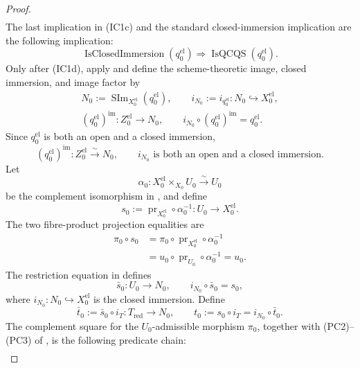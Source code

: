 \begin{proof}
\[\begin{aligned}
  \end{aligned}                                                   \tag{IC1c}
  \]
  The last implication in (IC1c) and the standard closed-immersion implication
  are the following implication:
  \[
    \operatorname{IsClosedImmersion}(q_0^{\mathrm{el}})
      \Longrightarrow\operatorname{IsQCQS}(q_0^{\mathrm{el}}).     \tag{IC1d}
  \]
  Only after (IC1d), apply
  and define the scheme-theoretic image, closed immersion, and image factor by
  \[
  \begin{gathered}
    N_0:=\operatorname{SIm}_{X_0^{\mathrm{el}}}(q_0^{\mathrm{el}}),\qquad
    i_{N_0}:=i_{q_0^{\mathrm{el}}}\colon
      N_0\hookrightarrow X_0^{\mathrm{el}},\\
    (q_0^{\mathrm{el}})^{\mathrm{im}}\colon
      Z_0^{\mathrm{el}}\longrightarrow N_0,\qquad
    i_{N_0}\circ(q_0^{\mathrm{el}})^{\mathrm{im}}=q_0^{\mathrm{el}}.
  \end{gathered}
  \]
  Since \(q_0^{\mathrm{el}}\) is both an open and a closed immersion,
  \[
    (q_0^{\mathrm{el}})^{\mathrm{im}}\colon
      Z_0^{\mathrm{el}}\xrightarrow{\sim}N_0,\qquad
    i_{N_0}\text{ is both an open and a closed immersion}.        \tag{IC2}
  \]
  Let
  \[
    \alpha_0\colon X_0^{\mathrm{el}}\times_{X_0}U_0
      \xrightarrow{\sim}U_0
  \]
  be the complement isomorphism in
  , and define
  \[
    s_0:=\operatorname{pr}_{X_0^{\mathrm{el}}}\circ\alpha_0^{-1}
      \colon U_0\to X_0^{\mathrm{el}}.
  \]
  The two fibre-product projection equalities are
  \[
  \begin{aligned}
    \pi_0\circ s_0
      &=\pi_0\circ\operatorname{pr}_{X_0^{\mathrm{el}}}
          \circ\alpha_0^{-1}\\
      &=u_0\circ\operatorname{pr}_{U_0}\circ\alpha_0^{-1}
       =u_0.
  \end{aligned}
  \]
  The restriction equation in
   defines
  \[
    \bar s_0\colon U_0\to N_0,\qquad
    i_{N_0}\circ\bar s_0=s_0,
  \]
  where $i_{N_0}\colon N_0\hookrightarrow X_0^{\mathrm{el}}$ is the closed
  immersion.  Define
  \[
    \bar t_0:=\bar s_0\circ i_T\colon T_{\mathrm{red}}\to N_0,
    \qquad
    t_0:=s_0\circ i_T=i_{N_0}\circ\bar t_0.
  \]
  The complement square for the $U_0$-admissible morphism $\pi_0$, together
  with (PC2)--(PC3) of
  , is the following predicate
  chain:
  \[
  \begin{gathered}

\end{gathered}\]
\end{proof}
